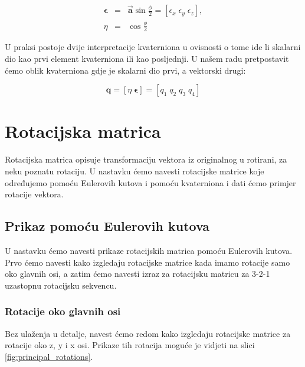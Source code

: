 \documentclass[times, utf8, diplomski, numeric]{templates/template}
\begin{document}
{{        \begin{equation}
        \label{eq:kvaternion}
        \begin{array}{rcl}
            \boldsymbol\epsilon &  = & \overrightarrow{\boldsymbol{a}}\sin\frac{\phi}{2} = \left[\epsilon_{x} \; \epsilon_{y} \; \epsilon_{z} \right], \\
            \eta & = & \cos\frac{\phi}{2}
        \end{array}
        \end{equation}

        U praksi postoje dvije interpretacije kvaterniona u ovisnosti o tome ide li skalarni dio kao prvi element kvaterniona ili kao posljednji. U našem radu pretpostavit ćemo oblik kvaterniona gdje je skalarni dio prvi, a vektorski drugi:

        \begin{equation}
        \label{eq:kvaternion_elem}
            \boldsymbol{q}=
            \left[\eta \; \boldsymbol\epsilon \right] = \left[q_{1} \; q_{2} \; q_{3} \; q_{4}\right]
        \end{equation}
    }

    \section{Rotacijska matrica}{
        Rotacijska matrica opisuje transformaciju vektora iz originalnog u rotirani, za neku poznatu rotaciju. U nastavku ćemo navesti rotacijske matrice koje određujemo pomoću Eulerovih kutova i pomoću kvaterniona i dati ćemo primjer rotacije vektora.

        \subsection{Prikaz pomoću Eulerovih kutova}{
            U nastavku ćemo navesti prikaze rotacijskih matrica pomoću Eulerovih kutova. Prvo ćemo navesti kako izgledaju rotacijske matrice kada imamo rotacije samo oko glavnih osi, a zatim ćemo navesti izraz za rotacijsku matricu za 3-2-1 uzastopnu rotacijsku sekvencu.

            \subsubsection{Rotacije oko glavnih osi}{
                Bez ulaženja u detalje, navest ćemo redom kako izgledaju rotacijske matrice za rotacije oko z, y i x osi. Prikaze tih rotacija moguće je vidjeti na slici \ref{fig:principal_rotations}.

}}}}
\end{document}

